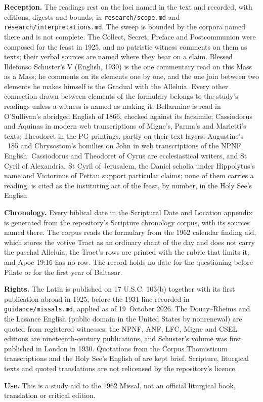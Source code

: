 {\textbf{Reception.} The readings rest on the loci named in the text and
recorded, with editions, digests and bounds, in \texttt{research/scope.md}
and \texttt{research/interpretations.md}. The sweep is bounded by the corpora
named there and is not complete. The Collect, Secret, Preface and
Postcommunion were composed for the feast in 1925, and no patristic witness
comments on them as texts; their verbal sources are named where they bear on a
claim. Blessed Ildefonso Schuster's  V (English, 1930)
is the one commentary read on this Mass as a Mass; he comments on its elements
one by one, and the one join between two elements he makes himself is the
Gradual with the Alleluia. Every other connection drawn between elements of
the formulary belongs to the study's readings unless a witness is named as
making it. Bellarmine is read in O'Sullivan's abridged English of 1866,
checked against its facsimile; Cassiodorus and Aquinas in modern web
transcriptions of Migne's, Parma's and Marietti's texts; Theodoret in the PG
printings, partly on their text layers; Augustine's ~185 and
Chrysostom's homilies on John in web transcriptions of the NPNF English.
Cassiodorus and Theodoret of Cyrus are ecclesiastical writers, and St Cyril of
Alexandria, St Cyril of Jerusalem, the Daniel scholia under Hippolytus's name
and Victorinus of Pettau support particular claims; none of them carries a
reading.  is cited as the instituting act of the feast, by
number, in the Holy See's English.

\textbf{Chronology.} Every biblical date in the Scriptural Date and Location
appendix is generated from the repository's Scripture chronology corpus,
with its sources named there. The corpus reads the formulary from the 1962
calendar finding aid, which stores the votive Tract as an ordinary chant of
the day and does not carry the paschal Alleluia; the Tract's rows are printed
with the rubric that limits it, and Apoc 19:16 has no row. The record holds no
date for the questioning before Pilate or for the first year of Baltasar.

\textbf{Rights.} The Latin is published on 17 U.S.C. 103(b) together with its
first publication abroad in 1925, before the 1931 line recorded in
\texttt{guidance/missals.md}, applied as of 19~October 2026. The Douay--Rheims
and the Lasance English (public domain in the United States by nonrenewal)
are quoted from registered witnesses; the NPNF, ANF, LFC, Migne and CSEL
editions are nineteenth-century publications, and Schuster's volume was first
published in London in 1930. Quotations from the Corpus Thomisticum
transcriptions and the Holy See's English of  are kept brief.
Scripture, liturgical texts and quoted translations are not relicensed by the
repository's licence.

\textbf{Use.} This is a study aid to the 1962 Missal, not an official
liturgical book, translation or critical edition.
\par}


